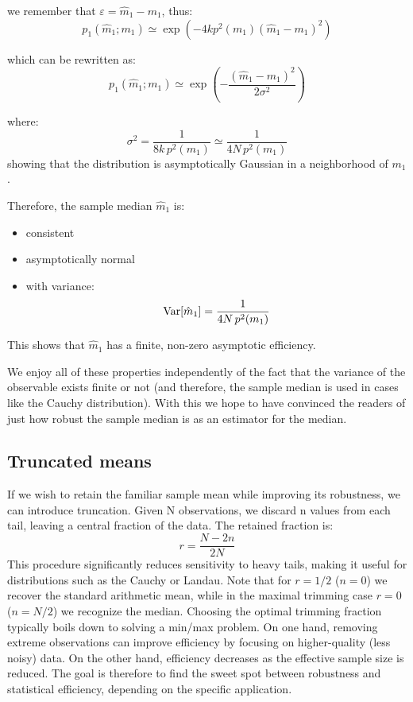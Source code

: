 we remember that $\varepsilon = \hat m_1 - m_1$, thus:
\[
p_1(\hat{m}_1; m_1)\simeq \exp\left(-4k p^2(m_1)(\hat m_1 - m_1)^2\right)
\]

which can be rewritten as:
\[
p_1(\hat{m}_1; m_1)\simeq \exp\left(-\frac{(\hat m_1 - m_1)^2}{2\sigma^2}\right)
\]

where: 
\[
\sigma^2 = \frac{1}{8k\,p^2(m_1)} \simeq \frac{1}{4N\,p^2(m_1)}
\]
showing that the distribution is asymptotically Gaussian in a neighborhood of $m_1$.

Therefore, the sample median $\hat{m}_1$ is:
\begin{itemize}
	\item consistent
	\item asymptotically normal
	\item with variance:
	\[
	\operatorname{Var}[\hat{m}_1] = \frac{1}{4N\,p^2(m_1)}
	\]
\end{itemize}

This shows that $\hat{m}_1$ has a finite, non-zero asymptotic efficiency.

We enjoy all of these properties independently of the fact that the variance of the observable exists finite or not (and therefore, the sample median is used in cases like the Cauchy distribution). With this we hope to have convinced the readers of just how robust the sample median is as an estimator for the median.



\subsection{Truncated means}

If we wish to retain the familiar sample mean while improving its robustness, we can introduce truncation. Given N observations, we discard n values from each tail, leaving a central fraction of the data. The retained fraction is:
\[
	r= \frac{N-2n}{2N}
\]
This procedure significantly reduces sensitivity to heavy tails, making it useful for distributions such as the Cauchy or Landau. Note that for $r=1/2$ ($n=0$) we recover the standard arithmetic mean, while in the maximal trimming case $r=0$ ($n=N/2$) we recognize the median. Choosing the optimal trimming fraction typically boils down to solving a min/max problem. On one hand, removing extreme observations can improve efficiency by focusing on higher-quality (less noisy) data. On the other hand, efficiency decreases as the effective sample size is reduced. The goal is therefore to find the sweet spot between robustness and statistical efficiency, depending on the specific application.

